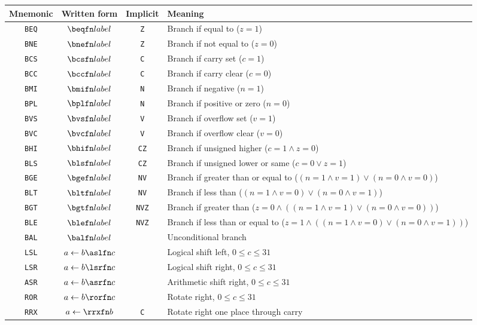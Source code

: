 \begin{longtable}{cccX}
Mnemonic & Written form & Implicit & Meaning\\
\hline
{\tt BEQ} & $\beqfn label$ & {\tt Z} & Branch if equal to ($z=1$)\\
{\tt BNE} & $\bnefn label$ & {\tt Z} & Branch if not equal to ($z=0$)\\
{\tt BCS} & $\bcsfn label$ & {\tt C} & Branch if carry set ($c=1$)\\
{\tt BCC} & $\bccfn label$ & {\tt C} & Branch if carry clear ($c=0$)\\
{\tt BMI} & $\bmifn label$ & {\tt N} & Branch if negative ($n=1$)\\
{\tt BPL} & $\bplfn label$ & {\tt N} & Branch if positive or zero ($n=0$)\\
{\tt BVS} & $\bvsfn label$ & {\tt V} & Branch if overflow set ($v=1$)\\
{\tt BVC} & $\bvcfn label$ & {\tt V} & Branch if overflow clear ($v=0$)\\
{\tt BHI} & $\bhifn label$ & {\tt CZ} & Branch if unsigned higher ($c=1 \wedge z=0$)\\
{\tt BLS} & $\blsfn label$ & {\tt CZ} & Branch if unsigned lower or same ($c=0 \vee z=1$)\\
{\tt BGE} & $\bgefn label$ & {\tt NV} & Branch if greater than or equal to ($(n=1 \wedge v=1) \vee (n=0 \wedge v=0)$)\\
{\tt BLT} & $\bltfn label$ & {\tt NV} & Branch if less than ($(n=1 \wedge v=0) \vee (n=0 \wedge v=1)$)\\
{\tt BGT} & $\bgtfn label$ & {\tt NVZ} & Branch if greater than ($z=0 \wedge ((n=1 \wedge v=1) \vee (n=0 \wedge v=0))$)\\
{\tt BLE} & $\blefn label$ & {\tt NVZ} & Branch if less than or equal to ($z=1 \wedge ((n=1 \wedge v=0) \vee (n=0 \wedge v=1))$)\\
{\tt BAL} & $\balfn label$ & & Unconditional branch\\
{\tt LSL} & $a \leftarrow b \aslfn c$ & & Logical shift left, $0 \leq c \leq 31$\\
{\tt LSR} & $a \leftarrow b \lsrfn c$ & & Logical shift right, $0 \leq c \leq 31$\\
{\tt ASR} & $a \leftarrow b \asrfn c$ & & Arithmetic shift right, $0 \leq c \leq 31$\\
{\tt ROR} & $a \leftarrow b \rorfn c$ & & Rotate right, $0 \leq c \leq 31$\\
{\tt RRX} & $a \leftarrow \rrxfn b$ & {\tt C} & Rotate right one place through carry\\

\end{longtable}
